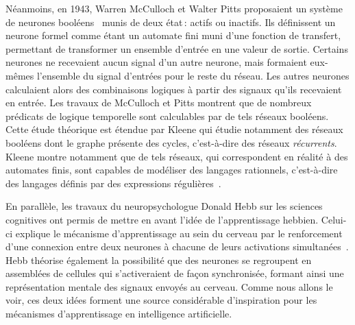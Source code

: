 Néanmoins, en 1943, Warren McCulloch et Walter Pitts proposaient un système de neurones booléens~\cite{mcculloch_logical_1943} munis de deux état\,: actifs ou inactifs. Ils définissent un neurone formel comme étant un automate fini muni d'une fonction de transfert, permettant de transformer un ensemble d'entrée en une valeur de sortie. Certains neurones ne recevaient aucun signal d'un autre neurone, mais formaient eux-mêmes l'ensemble du signal d'entrées pour le reste du réseau. Les autres neurones calculaient alors des combinaisons logiques à partir des signaux qu'ils recevaient en entrée. Les travaux de McCulloch et Pitts montrent que de nombreux prédicats de logique temporelle sont calculables par de tels réseaux booléens. Cette étude théorique est étendue par Kleene qui étudie notamment des réseaux booléens dont le graphe présente des cycles, c'est-à-dire des réseaux \emph{récurrents}. Kleene montre notamment que de tels réseaux, qui correspondent en réalité à des automates finis, sont capables de modéliser des langages rationnels, c'est-à-dire des langages définis par des expressions régulières~\cite{kleene_representation_1956}.

En parallèle, les travaux du neuropsychologue Donald Hebb sur les sciences cognitives ont permis de mettre en avant l'idée de l'apprentissage hebbien. Celui-ci explique le mécanisme d'apprentissage au sein du cerveau par le renforcement d'une connexion entre deux neurones à chacune de leurs activations simultanées~\cite{hebb_organization_1949}. Hebb théorise également la possibilité que des neurones se regroupent en \og{} assemblées de cellules \fg{} qui s'activeraient de façon synchronisée, formant ainsi une représentation mentale des signaux envoyés au cerveau. Comme nous allons le voir, ces deux idées forment une source considérable d'inspiration pour les mécanismes d'apprentissage en intelligence artificielle.

